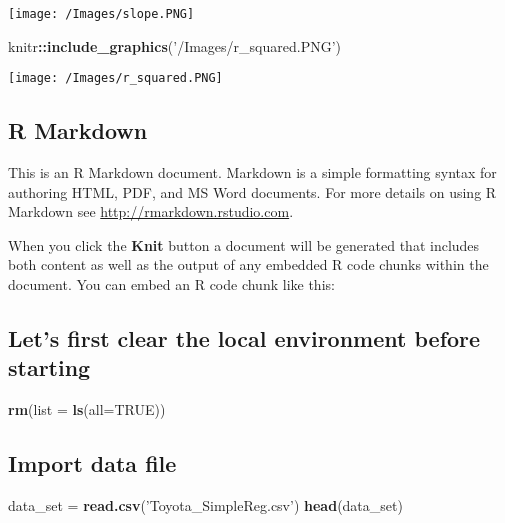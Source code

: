 \documentclass[]{article}
\newenvironment{Shaded}{\begin{snugshade}}{\end{snugshade}}
\newcommand{\DataTypeTok}[1]{\textcolor[rgb]{0.13,0.29,0.53}{#1}}
\newcommand{\KeywordTok}[1]{\textcolor[rgb]{0.13,0.29,0.53}{\textbf{#1}}}
\newcommand{\NormalTok}[1]{#1}
\newcommand{\OperatorTok}[1]{\textcolor[rgb]{0.81,0.36,0.00}{\textbf{#1}}}
\newcommand{\OtherTok}[1]{\textcolor[rgb]{0.56,0.35,0.01}{#1}}
\newcommand{\StringTok}[1]{\textcolor[rgb]{0.31,0.60,0.02}{#1}}
\begin{document}
\texttt{[image: /Images/slope.PNG]}

\begin{Shaded}
\begin{Highlighting}[]
\NormalTok{knitr}\OperatorTok{::}\KeywordTok{include_graphics}\NormalTok{(}\StringTok{'/Images/r_squared.PNG'}\NormalTok{)}
\end{Highlighting}
\end{Shaded}

\texttt{[image: /Images/r\_squared.PNG]}

\hypertarget{r-markdown}{%
\subsection{R Markdown}\label{r-markdown}}

This is an R Markdown document. Markdown is a simple formatting syntax
for authoring HTML, PDF, and MS Word documents. For more details on
using R Markdown see \url{http://rmarkdown.rstudio.com}.

When you click the \textbf{Knit} button a document will be generated
that includes both content as well as the output of any embedded R code
chunks within the document. You can embed an R code chunk like this:

\hypertarget{lets-first-clear-the-local-environment-before-starting}{%
\subsection{Let's first clear the local environment before
starting}\label{lets-first-clear-the-local-environment-before-starting}}

\begin{Shaded}
\begin{Highlighting}[]
\KeywordTok{rm}\NormalTok{(}\DataTypeTok{list =} \KeywordTok{ls}\NormalTok{(}\DataTypeTok{all=}\OtherTok{TRUE}\NormalTok{))}
\end{Highlighting}
\end{Shaded}

\hypertarget{import-data-file}{%
\subsection{Import data file}\label{import-data-file}}

\begin{Shaded}
\begin{Highlighting}[]
\NormalTok{data_set =}\StringTok{ }\KeywordTok{read.csv}\NormalTok{(}\StringTok{'Toyota_SimpleReg.csv'}\NormalTok{)}
\KeywordTok{head}\NormalTok{(data_set)}
\end{Highlighting}
\end{Shaded}
\end{document}
